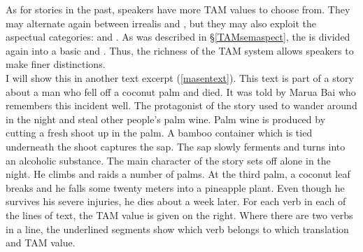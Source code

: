 As for stories in the past, speakers have more TAM values to choose from. They may alternate again between irrealis and , but they may also exploit the aspectual categories:  and . As was described in \S{}\ref{TAMsemaspect}, the  is divided again into a basic  and . Thus, the richness of the TAM system allows speakers to make finer distinctions.\\

I will show this in another text excerpt (\ref{masentext}). This text is part of a story about a man who fell off a coconut palm and died. It was told by Marua Bai who remembers this incident well. The protagonist of the story used to wander around in the night and steal other people's palm wine. Palm wine is produced by cutting a fresh shoot up in the palm. A bamboo container which is tied underneath the shoot captures the sap. The sap slowly ferments and turns into an alcoholic substance. The main character of the story sets off alone in the night. He climbs and raids a number of palms. At the third palm, a coconut leaf breaks and he falls some twenty meters into a pineapple plant. Even though he survives his severe injuries, he dies about a week later. For each verb in each of the lines of text, the TAM value is given on the right. Where there are two verbs in a line, the underlined segments show which verb belongs to which translation and TAM value.

